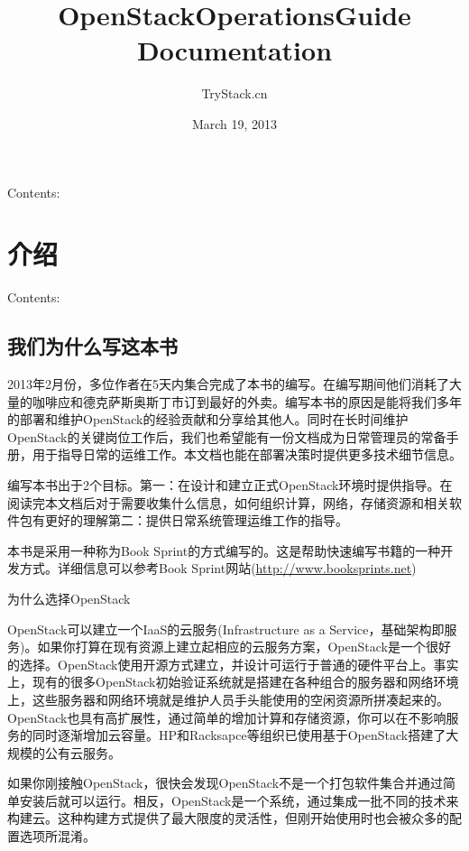 \documentclass[letterpaper,10pt,english]{sphinxmanual}
\title{OpenStackOperationsGuide Documentation}
\date{March 19, 2013}
\author{TryStack.cn}
\begin{document}
\maketitle
\tableofcontents
{}\label{index::doc}


Contents:


\chapter{介绍}
\label{Introduction/index:id1}\label{Introduction/index::doc}\label{Introduction/index:welcome-to-openstackoperationsguide-s-documentation}
Contents:


\section{我们为什么写这本书}
\label{Introduction/Why We Wrote This Book::doc}\label{Introduction/Why We Wrote This Book:id1}
2013年2月份，多位作者在5天内集合完成了本书的编写。在编写期间他们消耗了大量的咖啡应和德克萨斯奥斯丁市订到最好的外卖。编写本书的原因是能将我们多年的部署和维护OpenStack的经验贡献和分享给其他人。同时在长时间维护OpenStack的关键岗位工作后，我们也希望能有一份文档成为日常管理员的常备手册，用于指导日常的运维工作。本文档也能在部署决策时提供更多技术细节信息。

编写本书出于2个目标。第一：在设计和建立正式OpenStack环境时提供指导。在阅读完本文档后对于需要收集什么信息，如何组织计算，网络，存储资源和相关软件包有更好的理解第二：提供日常系统管理运维工作的指导。

本书是采用一种称为Book Sprint的方式编写的。这是帮助快速编写书籍的一种开发方式。详细信息可以参考Book Sprint网站(\href{http://www.booksprints.net}{http://www.booksprints.net})

为什么选择OpenStack

OpenStack可以建立一个IaaS的云服务(Infrastructure as a Service，基础架构即服务)。如果你打算在现有资源上建立起相应的云服务方案，OpenStack是一个很好的选择。OpenStack使用开源方式建立，并设计可运行于普通的硬件平台上。事实上，现有的很多OpenStack初始验证系统就是搭建在各种组合的服务器和网络环境上，这些服务器和网络环境就是维护人员手头能使用的空闲资源所拼凑起来的。OpenStack也具有高扩展性，通过简单的增加计算和存储资源，你可以在不影响服务的同时逐渐增加云容量。HP和Racksapce等组织已使用基于OpenStack搭建了大规模的公有云服务。

如果你刚接触OpenStack，很快会发现OpenStack不是一个打包软件集合并通过简单安装后就可以运行。相反，OpenStack是一个系统，通过集成一批不同的技术来构建云。这种构建方式提供了最大限度的灵活性，但刚开始使用时也会被众多的配置选项所混淆。
\end{document}
